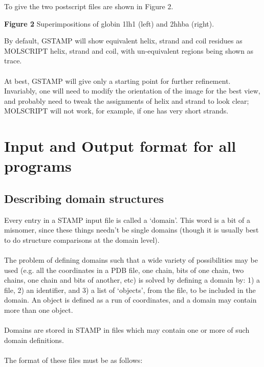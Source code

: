 To give the two postscript files are shown in Figure 2.\\

\vspace*{3.5in}
\noindent
\begin{scriptsize}
{\bf Figure 2} Superimpositions of globin 1lh1 (left) and 2hhba (right).\\
\end{scriptsize}

By default, GSTAMP will show equivalent helix, strand and coil residues
as MOLSCRIPT \al helix, \be strand and coil, with un-equivalent regions 
being shown as \Cal trace.\\
\\
At best, GSTAMP will give only a starting point for further refinement.  
Invariably, one will need to modify the orientation of the image for the 
best view, and probably need to tweak the assignments of helix and strand 
to look clear; MOLSCRIPT will not work, for example, if one has very 
short \be strands.

\chapter{Input and Output format for all programs}

\section{Describing domain structures}

Every entry in a STAMP input file is called a `domain'.  This word
is a bit of a misnomer, since these things needn't be single domains
(though it is usually best to do structure comparisons at the domain level).\\
\\
The problem of defining domains such that a wide variety of 
possibilities may be used (e.g. all the coordinates in a PDB file,
one  chain, bits of one chain, two chains, one chain and bits of
another, etc) is solved by defining a domain by: 1) a file, 2) an
identifier, and 3) a list of `objects', from the file, to be
included in the domain.  An object is defined as a run of \Cal
coordinates, and a domain may contain more than one object.\\
\\
Domains are stored in STAMP in files which may contain one or
more of such domain definitions.\\
\\
The format of these files must be as follows:\\

